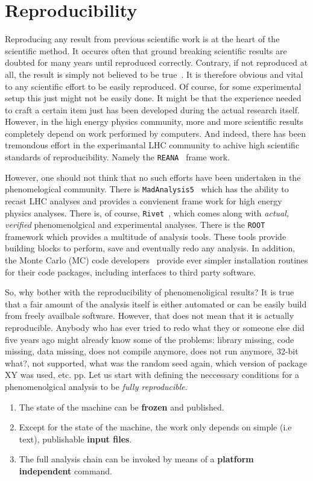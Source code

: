 
\section{Reproducibility}
Reproducing any result from previous scientific work is at the heart
of the scientific method. It occures often that ground breaking
scientific results are doubted for many years until reproduced
correctly. Contrary, if not reproduced at all, the result is simply
not believed to be true~\cite{}. It is therefore obvious and vital to
any scientific effort to be easily reproduced. Of course, for some
experimental setup this just might not be easily done. It might be
that the experience needed to craft a certain item just has been
developed during the actual research itself. However, in the high
energy physics community, more and more scientific results completely
depend on work performed by computers. And indeed, there has been
tremondous effort in the experimantal LHC community to achive high
scientific standards of reproducibility. Namely the
\texttt{REANA}~\cite{} frame work.

However, one should not think that no such efforts have been
undertaken in the phenomelogical community. There is
\texttt{MadAnalysis5}~\cite{} which has the ability to recast LHC
analyses and provides a convienent frame work for high energy physics
analyses. There is, of course, \texttt{Rivet}~\cite{}, which comes
along with \emph{actual, verified} phenomenolgical and experimental
analyses. There is the \texttt{ROOT}~\cite{} framework which provides
a multitude of analysis tools. These tools provide building blocks to
perform, save and eventually redo any analysis. In addition, the Monte
Carlo (MC) code developers~\cite{} provide ever simpler installation
routines for their code packages, including interfaces to third party
software.

So, why bother with the reproducibility of phenomenoligical results?
It is true that a fair amount of the analysis itself is either
automated or can be easily build from freely availbale
software. However, that does not mean that it is actually
reproducible. Anybody who has ever tried to redo what they or someone
else did five years ago might already know some of the problems:
library missing, code missing, data missing, does not compile anymore,
does not run anymore, 32-bit what?, not supported, what was the random
seed again, which version of package XY was used, etc. pp. Let us
start with defining the neccessary conditions for a phenomenolgical
analysis to be \emph{fully reproducible}.
%
\begin{enumerate}
\item The state of the machine can be {\bf frozen} and published.
\item Except for the state of the machine, the work only depends on
  simple (i.e text), publishable {\bf input files}.
\item The full analysis chain can be invoked by means of a
  {\bf platform independent} command.
\end{enumerate}
%

